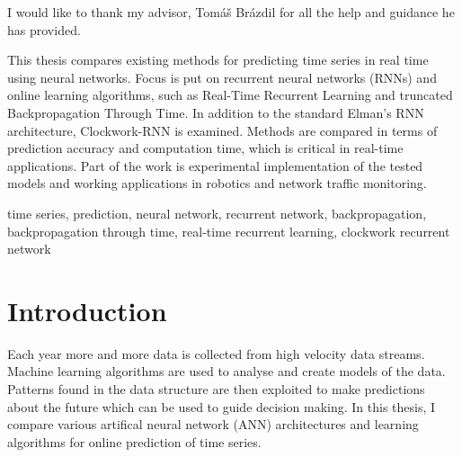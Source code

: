 \documentclass[12pt,oneside]{fithesis2}
\begin{document}
  \FrontMatter                    %
    \ThesisTitlePage                %
    \begin{ThesisDeclaration}       %
      \DeclarationText
      \AdvisorName
    \end{ThesisDeclaration}
    \begin{ThesisThanks}            %
      I would like to thank my advisor, Tomáš Brázdil for all the help and guidance he has provided.
    \end{ThesisThanks}
    \begin{ThesisAbstract}          %
      This thesis compares existing methods for predicting time series in real time using neural networks. Focus is put on recurrent neural networks (RNNs) and online learning algorithms, such as Real-Time Recurrent Learning and truncated Backpropagation Through Time. In addition to the standard Elman's RNN architecture, \mbox{Clockwork-RNN} is examined. Methods are compared in terms of prediction accuracy and computation time, which is critical in real-time applications. Part of the work is experimental implementation of the tested models and working applications in robotics and  network traffic monitoring.
    \end{ThesisAbstract}
    \begin{ThesisKeyWords}          %
	time series, prediction, neural network, recurrent network, backpropagation, backpropagation through time, real-time recurrent learning, clockwork recurrent network
    \end{ThesisKeyWords}
    \tableofcontents                %
   \listoftables                   %
   \listoffigures                  %
   
  
  \MainMatter
    \chapter{Introduction} %
Each year more and more data is collected from high velocity data streams. Machine learning algorithms are used to analyse and create models of the data. Patterns found in the data structure are then exploited to make predictions about the future which can be used to guide decision making. In this thesis, I compare various artifical neural network (ANN) architectures and learning algorithms for online prediction of time series.
\end{document}
